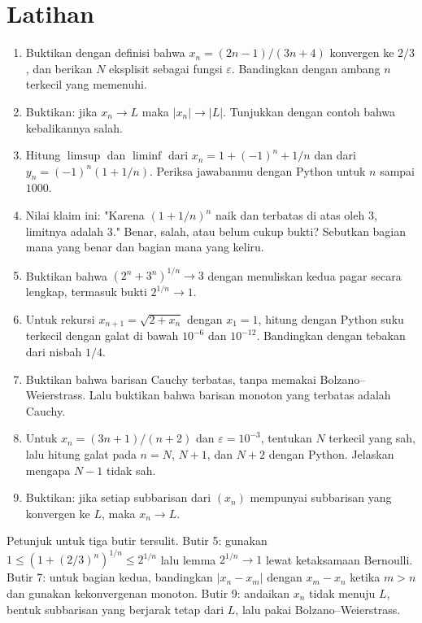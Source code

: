 \section{Latihan}

\begin{latihan}
\begin{enumerate}
  \item Buktikan dengan definisi bahwa $x_n=(2n-1)/(3n+4)$ konvergen ke $2/3$, dan
        berikan $N$ eksplisit sebagai fungsi $\varepsilon$. Bandingkan dengan
        ambang $n$ terkecil yang memenuhi.
  \item Buktikan: jika $x_n \to L$ maka $|x_n| \to |L|$. Tunjukkan dengan contoh
        bahwa kebalikannya salah.
  \item Hitung $\limsup$ dan $\liminf$ dari $x_n=1+(-1)^n+1/n$ dan dari
        $y_n=(-1)^n(1+1/n)$. Periksa jawabanmu dengan Python untuk $n$ sampai
        $1000$.
  \item Nilai klaim ini: "Karena $(1+1/n)^n$ naik dan terbatas di atas oleh $3$,
        limitnya adalah $3$." Benar, salah, atau belum cukup bukti? Sebutkan
        bagian mana yang benar dan bagian mana yang keliru.
  \item Buktikan bahwa $(2^n+3^n)^{1/n} \to 3$ dengan menuliskan kedua pagar
        secara lengkap, termasuk bukti $2^{1/n} \to 1$.
  \item Untuk rekursi $x_{n+1}=\sqrt{2+x_n}$ dengan $x_1=1$, hitung dengan Python
        suku terkecil dengan galat di bawah $10^{-6}$ dan $10^{-12}$. Bandingkan
        dengan tebakan dari nisbah $1/4$.
  \item Buktikan bahwa barisan Cauchy terbatas, tanpa memakai Bolzano--Weierstrass.
        Lalu buktikan bahwa barisan monoton yang terbatas adalah Cauchy.
  \item Untuk $x_n=(3n+1)/(n+2)$ dan $\varepsilon=10^{-3}$, tentukan $N$ terkecil
        yang sah, lalu hitung galat pada $n=N$, $N+1$, dan $N+2$ dengan Python.
        Jelaskan mengapa $N-1$ tidak sah.
  \item Buktikan: jika setiap subbarisan dari $(x_n)$ mempunyai subbarisan yang
        konvergen ke $L$, maka $x_n \to L$.
\end{enumerate}

Petunjuk untuk tiga butir tersulit. Butir 5: gunakan
$1 \le (1+(2/3)^n)^{1/n} \le 2^{1/n}$ lalu lemma $2^{1/n} \to 1$ lewat
ketaksamaan Bernoulli. Butir 7: untuk bagian kedua, bandingkan $|x_n-x_m|$ dengan
$x_m-x_n$ ketika $m>n$ dan gunakan kekonvergenan monoton. Butir 9: andaikan
$x_n$ tidak menuju $L$, bentuk subbarisan yang berjarak tetap dari $L$, lalu pakai
Bolzano--Weierstrass.
\end{latihan}

